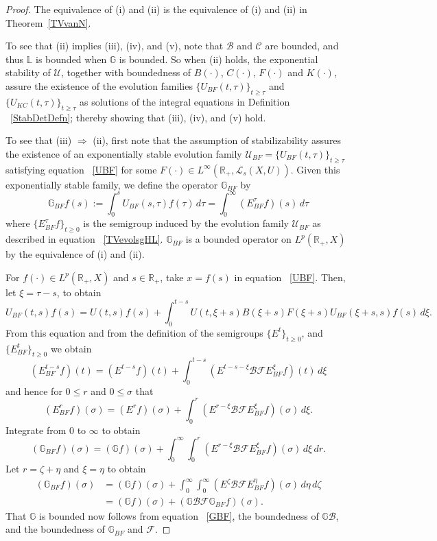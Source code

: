 \documentclass[10pt,psamsfonts,leqno]{siamltex}
\newcommand{\bbR}{\mathbb{R}}
\newcommand{\bbL}{\mathbb{L}}
\newcommand{\bbG}{\mathbb{G}}
\newcommand{\calB}{\mathcal{B}}
\newcommand{\calC}{\mathcal{C}}
\newcommand{\calF}{\mathcal{F}}
\newcommand{\calU}{\mathcal{U}}
\renewcommand{\t}{\tau}
\newcommand{\lb}{\label}
\newcommand{\LpRX}{{L^p(\bbR_+,X)}}
\begin{document}
\begin{proof}
The equivalence of (i) and (ii) is the equivalence of (i) and (ii) in
Theorem~\ref{TVvanN}.

To see that (ii) implies (iii), (iv), and (v), note that $\calB$ and
$\calC$
are  bounded, and thus $\bbL$ is bounded when $\bbG$ is bounded. So when
(ii) holds, the exponential stability of $\calU$, together with
boundedness
of $B(\cdot)$, $C(\cdot)$, $F(\cdot)$ and $K(\cdot)$, assure the
existence
of the evolution families $\{U_{BF}(t,\tau)\}_{t\ge \tau}$ and
$\{U_{KC}(t,\tau)\}_{t\ge \tau}$ as solutions of the integral equations
in
Definition ~\ref{StabDetDefn}; thereby showing that (iii), (iv), and (v)
hold.

To see that (iii) $\Rightarrow$ (ii), first note that the assumption of
stabilizability assures the existence of an exponentially stable
evolution
family $\mathcal{U}_{BF}=\{U_{BF}(t,\tau)\}_{t\ge \tau}$ satisfying
equation ~\eqref{UBF} for some $F(\cdot)\in
L^\infty(\bbR_+,\mathcal{L}_s(X,U))$. Given this exponentially stable
family, we define the operator $\bbG_{BF}$ by
\begin{equation}\lb{GBFdefn}
\bbG_{BF}f(s):= \int_0^s U_{BF}(s,\t)f(\t)\,d\t = \int_0^\infty
(E_{BF}^{\t}f)(s)\,d\t
\end{equation}
where $\{E_{BF}^{\t}f\}_{t\ge 0}$ is the semigroup induced by the
evolution
family $\calU_{BF}$ as described in equation ~\eqref{TVevolsgHL}.
$\bbG_{BF}$ is a bounded operator on $\LpRX$ by the equivalence of (i)
and
(ii).

For $f(\cdot) \in \LpRX $ and $s \in \bbR_+$, take $x=f(s)$ in equation
~\eqref{UBF}. Then, let $\xi = \t -s$, to obtain
\[
U_{BF}(t,s)f(s)=U(t,s)f(s)+ \int_0^{t-s}
U(t,\xi +s)B(\xi +s)F(\xi +s)U_{BF}(\xi +s,s)f(s)\,d\xi.
\] From this equation and from the definition of the semigroups $\{E^{t}\}_{t
\ge 0}$, and $\{E^{t}_{BF}\}_{t \ge 0}$ we obtain
\[
(E^{t-s}_{BF}f)(t) =(E^{t-s}f)(t) + \int_0^{t-s}(E^{t-s-\xi}\calB \calF
E_{BF}^{\xi}f)(t)\, d\xi
\]
and hence for $0 \le r$ and $0\le \sigma$ that
\[
(E^{r}_{BF}f)(\sigma) =(E^{r}f)(\sigma) + \int_0^{r}(E^{r-\xi}\calB
\calF
E_{BF}^{\xi}f)(\sigma)\, d\xi.
\]
Integrate from 0 to $\infty$ to obtain
\[
(\bbG_{BF }f)(\sigma) = (\bbG f)(\sigma) +
\int_0^{\infty}\int_0^{r}(E^{r-\xi}\calB \calF E_{BF}^{\xi}f)(\sigma)\,
d\xi\, dr.
\]
Let $r=\zeta +\eta$ and $\xi = \eta$ to obtain
\begin{equation}\lb{GBF}
\begin{aligned}
(\bbG_{BF }f)(\sigma) &= (\bbG f)(\sigma) +
\int_0^{\infty}\int_0^{\infty}(E^{\zeta}\calB \calF
E_{BF}^{\eta}f)(\sigma)\, d\eta\, d\zeta\\
&= (\bbG f)(\sigma) + (\bbG \calB \calF \bbG_{BF} f)(\sigma).
\end{aligned}
\end{equation}
That $\bbG$ is bounded now follows from equation ~\eqref{GBF}, the
boundedness of $\bbG\calB$, and the boundedness of $\bbG_{BF}$ and
$\calF$.


\end{proof}
\end{document}
